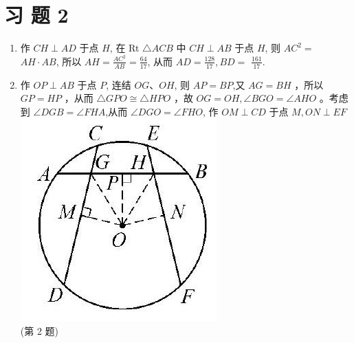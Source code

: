 \documentclass[10pt]{article}
\begin{document}
\section*{习 题 2}
\begin{enumerate}
  \item 作 $C H \perp A D$ 于点 $H$, 在 Rt $\triangle A C B$ 中 $C H \perp A B$ 于点 $H$, 则 $A C^{2}=$ $A H \cdot A B$, 所以 $A H=\frac{A C^{2}}{A B}=\frac{64}{17}$, 从而 $A D=\frac{128}{17}, B D=$ $\frac{161}{17}$.
  \item 作 $O P \perp A B$ 于点 $P$, 连结 $O G 、 O H$, 则 $A P=B P$,又 $A G=B H$ ，所以 $G P=H P$ ，从而 $\triangle G P O \cong \triangle H P O$ ，故 $O G=O H, \angle B G O=\angle A H O$ 。考虑到 $\angle D G B=\angle F H A$,从而 $\angle D G O=\angle F H O$, 作 $O M \perp C D$ 于点 $M, O N \perp E F$\\
\includegraphics[max width=\textwidth, center]{2024_10_30_66b8e5e701da2093c133g-087(1)}\\
(第 2 题)
\end{enumerate}
\end{document}
